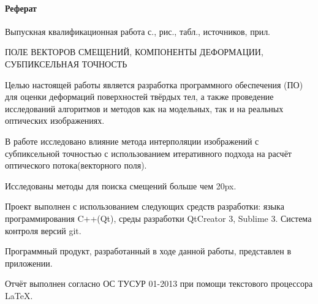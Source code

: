 \newpage
{}
\paragraph{\hfill Реферат \hfill}
Выпускная квалификационная работа  с.,  рис.,  табл.,  источников,  прил.


ПОЛЕ ВЕКТОРОВ СМЕЩЕНИЙ, КОМПОНЕНТЫ ДЕФОРМАЦИИ, СУБПИКСЕЛЬНАЯ ТОЧНОСТЬ

Целью настоящей работы является разработка программного обеспечения (ПО) для оценки деформаций поверхностей твёрдых тел, а также проведение исследований алгоритмов и методов как на модельных, так и на реальных оптических изображениях.

В работе исследовано влияние метода интерполяции изображений с субпиксельной точностью с использованием итеративного подхода на расчёт оптического потока(векторного поля).

Исследованы методы для поиска смещений больше чем 20px. 

 

Проект выполнен с использованием следующих средств разработки: языка программирования C++(Qt), среды разработки QtCreator 3, Sublime 3. Система контроля версий git.

Программный продукт, разработанный в ходе данной работы, представлен в приложении.

Отчёт выполнен согласно ОС ТУСУР 01-2013 при помощи текстового процессора \LaTeX.